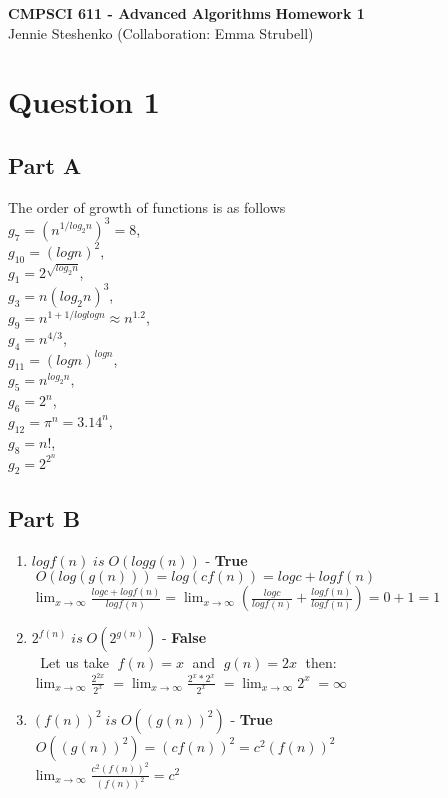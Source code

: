 \documentclass{article}
\begin{document}
\begin{center} \LARGE\textbf{CMPSCI 611 - Advanced Algorithms}
\Large\textbf{Homework 1}
\vspace{0.5cm}\\Jennie Steshenko \small{(Collaboration: Emma Strubell)}
\end{center}

\section*{Question 1}
\subsection*{Part A}
The order of growth of functions is as follows
\\$g_7 = (n^{1/log_2 n})^3 = 8$, 
\\$g_{10} = (log n)^2$,
\\$g_1 = 2^{\sqrt{log_2 n}}$,
\\$g_3 = n(log_2 n)^3$,
\\$g_9 = n^{1+1/log logn}\approx{n^1.2}$,
\\$g_4 = n^{4/3}$,
\\$g_{11} = (logn)^{log n}$,
\\$g_5 = n^{log_2 n}$,
\\$g_6 = 2^n$,
\\$g_{12} = \pi^n = 3.14^n$,
\\$g_8 = n!$,
\\$g_2 = 2^{2^n}$

\subsection*{Part B}
\begin{enumerate}
  \item $log {f(n)} \; is \; O(log {g(n)})$ - \textbf{True}
    \\ $\; O(log(g(n))) = log {(cf(n))} = log c + log {f(n)}$
	\\ $\lim_{x\to\infty}\frac{log c + log {f(n)}}{log {f(n)}} =
	    \lim_{x\to\infty}(\frac{log c}{log {f(n)}} + \frac{log {f(n)}}{log
	    {f(n)}}) = 0 + 1 = 1$
  \item $2^{f(n)} \; is \; O(2^{g(n)})$ - \textbf{False}
    \\ $\; $ Let us take $\; f(n) = x \;$ and $\; g(n) = 2x \;$ then:
    \\ $\lim_{x\to\infty}\frac{2^{2x}}{2^x} \; =
        \lim_{x\to\infty}\frac{2^x*2^x}{2^x} \; =
        \lim_{x\to\infty}{2^x} \; = \infty$
  \item $(f(n))^2 \; is \; O((g(n))^2)$ - \textbf{True}
    \\ $\; O((g(n))^2) = (cf(n))^2 = c^2(f(n))^2$
    \\ $\lim_{x\to\infty}\frac{c^2(f(n))^2}{(f(n))^2} = c^2$
\end{enumerate}
\vfill
\end{document}
